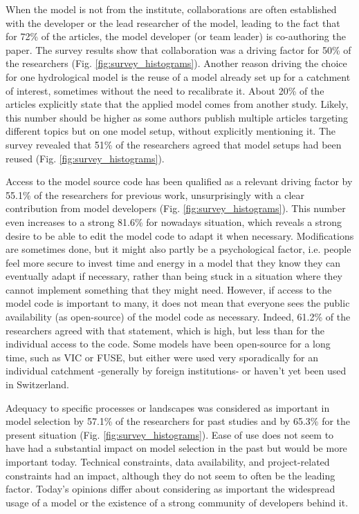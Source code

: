 \documentclass[10pt,a4paper]{article}
\begin{document}
When the model is not from the institute, collaborations are often established with the developer or the lead researcher of the model, leading to the fact that for 72\% of the articles, the model developer (or team leader) is co-authoring the paper. The survey results show that collaboration was a driving factor for 50\% of the researchers (Fig. \ref{fig:survey_histograms}). Another reason driving the choice for one hydrological model is the reuse of a model already set up for a catchment of interest, sometimes without the need to recalibrate it. About 20\% of the articles explicitly state that the applied model comes from another study. Likely, this number should be higher as some authors publish multiple articles targeting different topics but on one model setup, without explicitly mentioning it. The survey revealed that 51\% of the researchers agreed that model setups had been reused (Fig. \ref{fig:survey_histograms}).

Access to the model source code has been qualified as a relevant driving factor by 55.1\% of the researchers for previous work, unsurprisingly with a clear contribution from model developers (Fig. \ref{fig:survey_histograms}). This number even increases to a strong 81.6\% for nowadays situation, which reveals a strong desire to be able to edit the model code to adapt it when necessary. Modifications are sometimes done, but it might also partly be a psychological factor, i.e. people feel more secure to invest time and energy in a model that they know they can eventually adapt if necessary, rather than being stuck in a situation where they cannot implement something that they might need. However, if access to the model code is important to many, it does not mean that everyone sees the public availability (as open-source) of the model code as necessary. Indeed, 61.2\% of the researchers agreed with that statement, which is high, but less than for the individual access to the code. Some models have been open-source for a long time, such as VIC or FUSE, but either were used very sporadically for an individual catchment -generally by foreign institutions- or haven't yet been used in Switzerland.

Adequacy to specific processes or landscapes was considered as important in model selection by 57.1\% of the researchers for past studies and by 65.3\% for the present situation (Fig. \ref{fig:survey_histograms}). Ease of use does not seem to have had a substantial impact on model selection in the past but would be more important today. Technical constraints, data availability, and project-related constraints had an impact, although they do not seem to often be the leading factor. Today's opinions differ about considering as important the widespread usage of a model or the existence of a strong community of developers behind it. 
\end{document}
